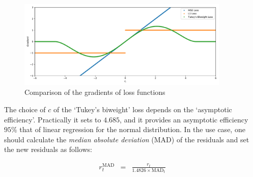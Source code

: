 \begin{figure}
    \centering
    \includegraphics[width=0.9\textwidth]{figures/gradient.pdf}
    \caption{Comparison of the gradients of loss functions}
    \label{fig:gradient}
\end{figure}

The choice of $c$ of the `Tukey's biweight' loss depends on the `asymptotic efficiency'. Practically it sets to $4.685$, and it provides an asymptotic efficiency $95\%$ that of linear regression for the normal distribution. In the use case, one should calculate the {\it median absolute deviation} (MAD) of the residuals and set the new residuals as follows:

\begin{eqnarray}
    r_{t}^{\mathrm{MAD}} & =& \frac{r_t}{1.4826 \times \mathrm{MAD}_{t}}
\end{eqnarray}